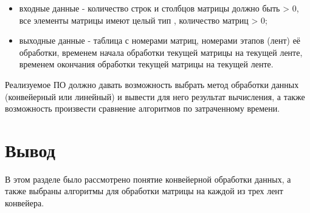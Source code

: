 \begin{itemize}
    \item входные данные - количество строк и столбцов матрицы должно быть > 0, все элементы матрицы имеют целый тип , количество матриц > 0;
    \item выходные данные - таблица с номерами матриц, номерами этапов (лент) её обработки, временем начала обработки текущей матрицы на текущей ленте, временем окончания обработки текущей матрицы на текущей ленте.
\end{itemize}

Реализуемое ПО должно давать возможность выбрать метод обработки данных (конвейерный или линейный) и вывести для него результат вычисления, а также возможность произвести сравнение алгоритмов по затраченному времени.



\section{Вывод}

В этом разделе было рассмотрено понятие конвейерной обработки данных, а также выбраны алгоритмы для обработки матрицы на каждой из трех лент конвейера.

 